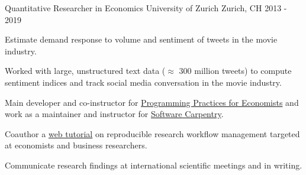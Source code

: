 \begin{section}[Experience]
    \entry%
  {Quantitative Researcher in Economics} %
  {University of Zurich} %
  {Zurich, CH} %
  {2013 - 2019} %
  {%
    \begin{entrylist}
      \item Estimate demand response to volume and sentiment of tweets in the movie industry. 
      \item Worked with large, unstructured text data ($\approx$ 300 million tweets) to compute sentiment indices and track social media conversation in the movie industry.
      \item Main developer and co-instructor for \href{https://pp4rs.github.io/}{ Programming Practices for Economists} and work as a maintainer and instructor for \href{https://uzhcrs.github.io/2019-02-07-zurich/}{ Software Carpentry}.
      \item Coauthor a \href{https://lachlandeer.github.io/teaching/swc-dc/}{ web tutorial} on reproducible research workflow management targeted at economists and business researchers.
      \item Communicate research findings at international scientific meetings and in writing.

    \end{entrylist}
  }%
  
\end{section}

